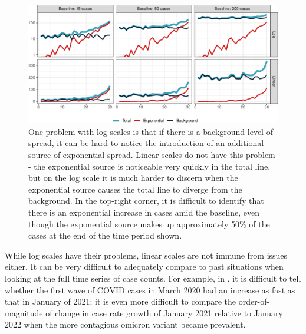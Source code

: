 \documentclass[article]{jdssv}\usepackage[]{graphicx}\usepackage[]{color}
\newenvironment{knitrout}{}{} %
\begin{document}
\begin{knitrout}\footnotesize
{}\color{fgcolor}\begin{figure}

{\centering \includegraphics[width=.95\linewidth]{Figures_R/fig-log-scale-failures-1} 

}

\caption[One problem with log scales is that if there is a background level of spread, it can be hard to notice the introduction of an additional source of exponential spread]{One problem with log scales is that if there is a background level of spread, it can be hard to notice the introduction of an additional source of exponential spread. Linear scales do not have this problem - the exponential source is noticeable very quickly in the total line, but on the log scale it is much harder to discern when the exponential source causes the total line to diverge from the background. In the top-right corner, it is difficult to identify that there is an exponential increase in cases amid the baseline, even though the exponential source makes up approximately 50\% of the cases at the end of the time period shown.}\label{fig:log-scale-failures}
\end{figure}

\end{knitrout}



While log scales have their problems, linear scales are not immune from issues either. It can be very difficult to adequately compare to past situations when looking at the full time series of case counts. For example, in , it is difficult to tell whether the first wave of COVID cases in March 2020 had an increase as fast as that in January of 2021; it is even more difficult to compare the order-of-magnitude of change in case rate growth of January 2021 relative to January 2022 when the more contagious omicron variant became prevalent. 
\end{document}
